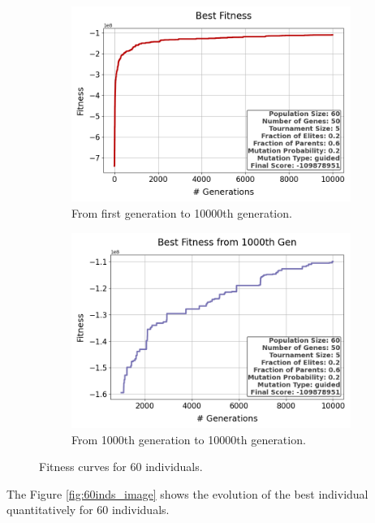 \documentclass{assignment}
\begin{document}
\begin{figure}[h!]
    \begin{subfigure}{0.5\textwidth}
        \includegraphics[width=\textwidth]{figures/best_fitness_output_60_50_5_0.2_0.6_0.2_guided.png}
        \caption{From first generation to 10000th generation.}
    \end{subfigure}\hfill
    \begin{subfigure}{0.5\textwidth}
        \includegraphics[width=\textwidth]{figures/best_fitness_1000_output_60_50_5_0.2_0.6_0.2_guided.png}
        \caption{From 1000th generation to 10000th generation.}
    \end{subfigure}
    \caption{Fitness curves for 60 individuals.}
\label{fig:60inds}
\end{figure}

The Figure \ref{fig:60inds_image} shows the evolution of the best individual quantitatively for 60 individuals.
\end{document}
